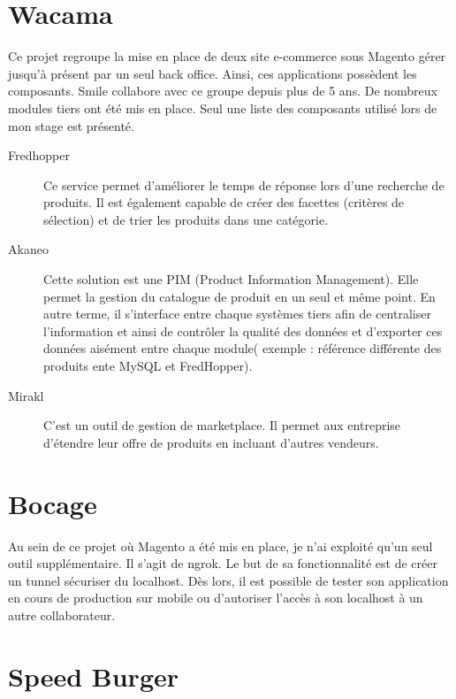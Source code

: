 \documentclass[12pt, a4paper, twoside]{report}
\begin{document}
\section{Wacama}

Ce projet regroupe la mise en place de deux site e-commerce sous Magento gérer jusqu'à présent par un seul back office. Ainsi, ces applications possèdent les composants. Smile collabore avec ce groupe depuis plus de 5 ans. De nombreux modules tiers ont été mis en place. Seul une liste des composants utilisé lors de mon stage est présenté. \\

\begin{description}
	\item[Fredhopper] Ce service permet d'améliorer le temps de réponse lors d'une recherche de produits. Il est également capable de créer des facettes (critères de sélection) et de trier les produits dans une catégorie. \\
	
	\item[Akaneo] Cette solution est une PIM (Product Information Management). Elle permet la gestion du catalogue de produit en un seul et même point. En autre terme, il s'interface entre chaque systèmes tiers afin de centraliser l'information et ainsi de contrôler la qualité des données et d'exporter ces données aisément entre chaque module( exemple : référence différente des produits ente MySQL et FredHopper). \\
	
	\item[Mirakl] C'est un outil de gestion de marketplace. Il permet aux entreprise d'étendre leur offre de produits en incluant d'autres vendeurs. \\
\end{description}

\section{Bocage}

Au sein de ce projet où Magento a été mis en place, je n'ai exploité qu'un seul outil supplémentaire. Il s'agit de ngrok. Le but de sa fonctionnalité est de créer un tunnel sécuriser du localhost. Dès lors, il est possible de tester son application en cours de production sur mobile ou d'autoriser l'accès à son localhost à un autre collaborateur.

\section{Speed Burger}
\end{document}
